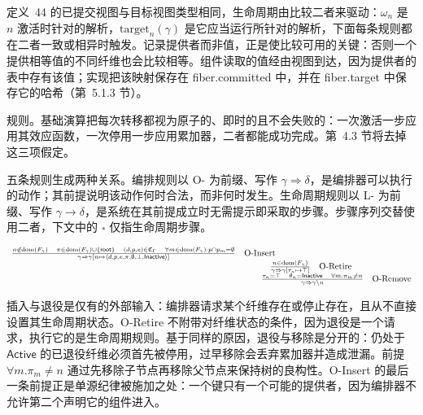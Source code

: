 \documentclass[
  10
]{article}
\begin{document}
定义~44 的已提交视图与目标视图类型相同，生命周期由比较二者来驱动：\(\omega _ { n }\) 是 $n$ 激活时针对的解析，\(\mathrm { t a r g e t } _ { n } ( \gamma )\) 是它应当运行所针对的解析，下面每条规则都在二者一致或相异时触发。记录提供者而非值，正是使比较可用的关键：否则一个提供相等值的不同纤维也会比较相等。组件读取的值经由视图到达，因为提供者的表中存有该值；实现把该映射保存在 fiber.committed 中，并在 fiber.target 中保存它的哈希（第~5.1.3 节）。

规则。基础演算把每次转移都视为原子的、即时的且不会失败的：一次激活一步应用其效应函数，一次停用一步应用累加器，二者都能成功完成。第~4.3 节将去掉这三项假定。

五条规则生成两种关系。编排规则以 O- 为前缀、写作 \(\gamma \Rightarrow \delta\)，是编排器可以执行的动作；其前提说明该动作何时合法，而非何时发生。生命周期规则以 L- 为前缀、写作 \(\gamma \longrightarrow \delta\)，是系统在其前提成立时无需提示即采取的步骤。步骤序列交替使用二者，下文中的 \(\stackrel { * } {  }\) 仅指生命周期步骤。

\[
\begin{array} { r l }
{ \frac { n \not \in \mathrm { d o m } \left( F _ { \gamma } \right) \quad \pi \in \mathrm { d o m } \left( F _ { \gamma } \right) \cup \{ \mathsf { r o o t } \} \quad ( d , p , e ) \in \mathfrak { C } _ { \Gamma } \quad \forall m \in \mathrm { d o m } \left( F _ { \gamma } \right) \cdot p \cap p _ { m } = \emptyset } { \gamma \Rightarrow \gamma [ n \mapsto \langle d , p , e , \pi , \emptyset , \bot , \mathsf { I n a c t i v e } \rangle ] } } & { \mathrm { O } \text {-Insert} } \\
& { \qquad \quad \frac { n \in \mathrm { d o m } \left( F _ { \gamma } \right) } { \gamma \Rightarrow \gamma [ \tau _ { n } \mapsto \top ] } \quad \mathrm { O } \text {-Retire} } \\
& { \qquad \frac { \tau _ { n } = \top \quad \theta _ { n } = \mathsf { I n a c t i v e } \quad \forall m . \pi _ { m } \neq n } { \gamma \Rightarrow \gamma \setminus n } \quad \mathrm { O } \text {-Remove} }
\end{array}
\]

插入与退役是仅有的外部输入：编排器请求某个纤维存在或停止存在，且从不直接设置其生命周期状态。O-Retire 不附带对纤维状态的条件，因为退役是一个请求，执行它的是生命周期规则。基于同样的原因，退役与移除是分开的：仍处于 $\mathsf { A c t i v e }$ 的已退役纤维必须首先被停用，过早移除会丢弃累加器并造成泄漏。前提 \(\forall m . \pi _ { m } \neq n\) 通过先移除子节点再移除父节点来保持树的良构性。O-Insert 的最后一条前提正是单源纪律被施加之处：一个键只有一个可能的提供者，因为编排器不允许第二个声明它的组件进入。
\end{document}
